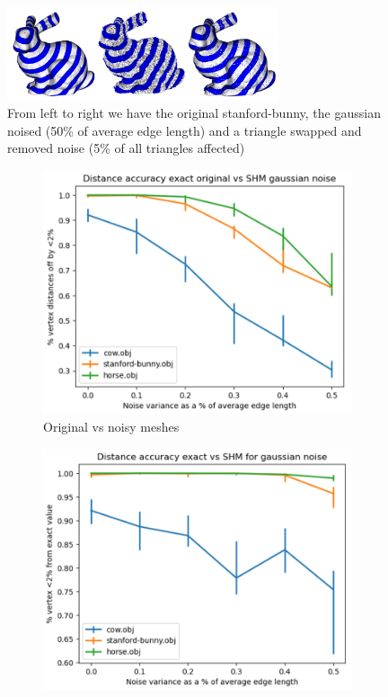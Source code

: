 \documentclass[sigconf, nonacm]{acmart}
\begin{document}
\begin{figure}
  \centering
  \includegraphics[width=8cm]{all_bunnies.png}
  \caption{From left to right we have the original stanford-bunny, the gaussian noised (50\% of average edge length) and a triangle swapped and removed noise (5\% of all triangles affected)}
  \label{fig:all_bunnies}
  \Description{}
\end{figure}

\begin{figure}[htbp]
  \centering
  \hfill
  \begin{subfigure}[b]{0.23\textwidth}
    \centering
    \includegraphics[width=\textwidth]{original_vs_noisy.png}
    \caption{Original vs noisy meshes}
    \label{fig:original_vs_noisy}
  \end{subfigure}
  \begin{subfigure}[b]{0.23\textwidth}
    \centering
    \includegraphics[width=\textwidth]{noisy_vs_noisy.png}

\end{subfigure}
\end{figure}
\end{document}
